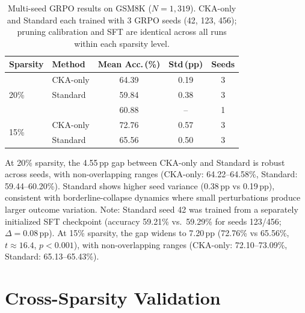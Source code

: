 \begin{table}[h]
\centering
\small
\caption{Multi-seed GRPO results on GSM8K ($N{=}1{,}319$). CKA-only and Standard each trained with 3 GRPO seeds (42, 123, 456); pruning calibration and SFT are identical across all runs within each sparsity level.}
\label{tab:multiseed}
\begin{tabular}{@{}llccc@{}}
\toprule
Sparsity & Method & Mean Acc.\,(\%) & Std\,(pp) & Seeds \\
\midrule
\multirow{3}{*}{20\%} & CKA-only & 64.39 & 0.19 & 3 \\
 & Standard & 59.84 & 0.38 & 3 \\
 & \rasp{} & 60.88 & -- & 1 \\
\midrule
\multirow{2}{*}{15\%} & CKA-only & 72.76 & 0.57 & 3 \\
 & Standard & 65.56 & 0.50 & 3 \\
\bottomrule
\end{tabular}
\end{table}

At 20\% sparsity, the 4.55\,pp gap between CKA-only and Standard is robust across seeds, with non-overlapping ranges (CKA-only: 64.22--64.58\%, Standard: 59.44--60.20\%).
Standard shows higher seed variance (0.38\,pp vs 0.19\,pp), consistent with borderline-collapse dynamics where small perturbations produce larger outcome variation.
Note: Standard seed 42 was trained from a separately initialized SFT checkpoint (accuracy 59.21\% vs.\ 59.29\% for seeds 123/456; $\Delta = 0.08$\,pp).
At 15\% sparsity, the gap widens to 7.20\,pp (72.76\% vs 65.56\%, $t{\approx}16.4$, $p{<}0.001$), with non-overlapping ranges (CKA-only: 72.10--73.09\%, Standard: 65.13--65.43\%).

\section{Cross-Sparsity Validation}
\label{sec:appendix_cross_sparsity}


